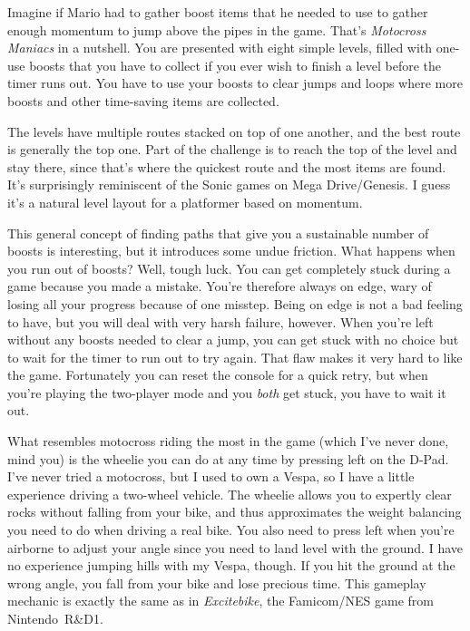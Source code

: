 \documentclass{book}
\let\oldcenter\center
\let\oldendcenter\endcenter
\renewenvironment{center}{\setlength\topsep{0pt}\oldcenter}{\oldendcenter}
\begin{document}
Imagine if Mario had to gather boost items that he needed to use to gather enough momentum to jump above the pipes in the game. That’s \emph{Motocross Maniacs} in a nutshell. You are presented with eight simple levels, filled with one-use boosts that you have to collect if you ever wish to finish a level before the timer runs out. You have to use your boosts to clear jumps and loops where more boosts and other time-saving items are collected.

The levels have multiple routes stacked on top of one another, and the best route is generally the top one. Part of the challenge is to reach the top of the level and stay there, since that’s where the quickest route and the most items are found. It’s surprisingly reminiscent of the Sonic games on Mega Drive/Genesis. I guess it’s a natural level layout for a platformer based on momentum.

\begin{center}
\vspace{8pt}
\quad\vspace{4pt}
\end{center}

This general concept of finding paths that give you a sustainable number of boosts is interesting, but it introduces some undue friction. What happens when you run out of boosts? Well, tough luck. You can get completely stuck during a game because you made a mistake. You’re therefore always on edge, wary of losing all your progress because of one misstep. Being on edge is not a bad feeling to have, but you will deal with very harsh failure, however. When you’re left without any boosts needed to clear a jump, you can get stuck with no choice but to wait for the timer to run out to try again. That flaw makes it very hard to like the game. Fortunately you can reset the console for a quick retry, but when you’re playing the two-player mode and you \emph{both} get stuck, you have to wait it out.

What resembles motocross riding the most in the game (which I’ve never done, mind you) is the wheelie you can do at any time by pressing left on the D-Pad. I’ve never tried a motocross, but I used to own a Vespa, so I have a little experience driving a two-wheel vehicle. The wheelie allows you to expertly clear rocks without falling from your bike, and thus approximates the weight balancing you need to do when driving a real bike. You also need to press left when you’re airborne to adjust your angle since you need to land level with the ground. I have no experience jumping hills with my Vespa, though. If you hit the ground at the wrong angle, you fall from your bike and lose precious time. This gameplay mechanic is exactly the same as in \emph{Excitebike}, the Famicom/NES game from Nintendo R\&D1.
\end{document}
